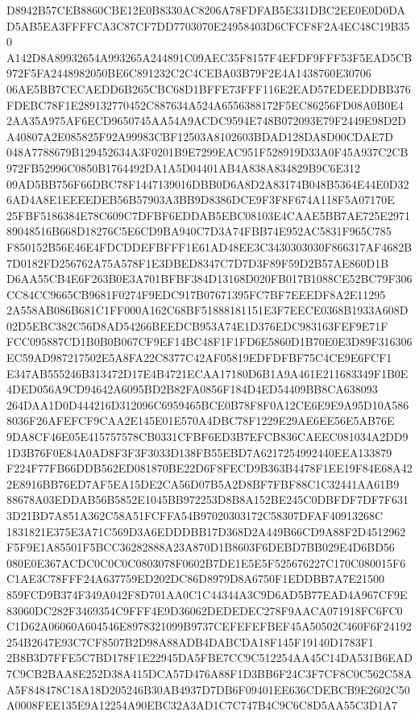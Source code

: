 \documentclass[UTF8,fontset=fandol,zihao=-4,a4paper]{ctexart}
\begin{document}
{{D8942B57CEB8860CBE12E0B8330AC8206A78FDFAB5E331DBC2EE0E0D0DAD5AB5EA3FFFFCA3C87CF7DD7703070E24958403D6CFCF8F2A4EC48C19B350
A142D8A89932654A993265A244891C09AEC35F8157F4EFDF9FFF53F5EAD5CB972F5FA2448982050BE6C891232C2C4CEBA03B79F2E4A1438760E30706
06AE5BB7CECAEDD6B265CBC68D1BFFE73FFF116E2EAD57EDEEDDBB376FDEBC78F1E289132770452C887634A524A6556388172F5EC86256FD08A0B0E4
2AA35A975AF6ECD9650745AA54A9ACDC9594E748B072093E79F2449E98D2DA40807A2E085825F92A99983CBF12503A8102603BDAD128DA8D00CDAE7D
048A7788679B129452634A3F0201B9E7299EAC951F528919D33A0F45A937C2CB972FB52996C0850B1764492DA1A5D04401AB4A838A834829B9C6E312
09AD5BB756F66DBC78F1447139016DBB0D6A8D2A83174B048B5364E44E0D326AD4A8E1EEEEDEB56B57903A3BB9D8386DCE9F3F8F674A118F5A07170E
25FBF5186384E78C609C7DFBF6EDDAB5EBC08103E4CAAE5BB7AE725E297189048516B668D18276C5E6CD9BA940C7D3A74FBB74E952AC5831F965C785
F850152B56E46E4FDCDDEFBFFF1E61AD48EE3C3430303030F866317AF4682B7D0182FD256762A75A578F1E3DBED8347C7D7D3F89F59D2B57AE860D1B
D6AA55CB4E6F263B0E3A701BFBF384D13168D020FB017B1088CE52BC79F306CC84CC9665CB9681F0274F9EDC917B07671395FC7BF7EEEDF8A2E11295
2A558AB086B681C1FF000A162C68BF51888181151E3F7EECE0368B1933A608D02D5EBC382C56D8AD54266BEEDCB953A74E1D376EDC983163FEF9E71F
FCC095887CD1B0B0B067CF9EF14BC48F1F1FD6E5860D1B70E0E3D89F316306EC59AD987217502E5A8FA22C8377C42AF05819EDFDFBF75C4CE9E6FCF1
E347AB555246B313472D17E4B4721ECAA17180D6B1A9A461E211683349F1B0E4DED056A9CD94642A6095BD2B82FA0856F184D4ED54409BB8CA638093
264DAA1D0D444216D312096C6959465BCE0B78F8F0A12CE6E9E9A95D10A5868036F26AFEFCF9CAA2E145E01E570A4DBC78F1229E29AE6EE56E5AB76E
9DA8CF46E05E415757578CB0331CFBF6ED3B7EFCB836CAEEC081034A2DD91D3B76F0E84A0AD8F3F3F3033D138FB55EBD7A6217254992440EEA133879
F224F77FB66DDB562ED081870BE22D6F8FECD9B363B4478F1EE19F84E68A422E8916BB76ED7AF5EA15DE2CA56D07B5A2D8BF7FBF88C1C32441AA61B9
88678A03EDDAB56B5852E1045BB972253D8B8A152BE245C0DBFDF7DF7F6313D21BD7A851A362C58A51FCFFA54B97020303172C58307DFAF40913268C
1831821E375E3A71C569D3A6EDDDBB17D368D2A449B66CD9A88F2D4512962F5F9E1A85501F5BCC36282888A23A870D1B8603F6DEBD7BB029E4D6BD56
080E0E367ACDC0C0C0C0803078F0602B7DE1E5E5F525676227C170C080015F6C1AE3C78FFF24A637759ED202DC86D8979D8A6750F1EDDBB7A7E21500
859FCD9B374F349A042F8D701AA0C1C44344A3C9D6AD5B77EAD4A967CF9E83060DC282F3469354C9FFF4E9D36062DEDEDEC278F9AACA071918FC6FC0
C1D62A06060A604546E8978321099B9737CEFEFEFBEF45A50502C460F6F24192254B2647E93C7CF8507B2D98A88ADB4DABCDA18F145F19140D1783F1
2B8B3D7FFE5C7BD178F1E22945DA5FBE7CC9C512254AA45C14DA531B6EAD7C9CB2BAA8E252D38A415DCA57D476A88F1D3BB6F24C3F7CF8C0C562C58A
A5F848478C18A18D205246B30AB4937D7DB6F09401EE636CDEBCB9E2602C50A0008FEE135E9A12254A90EBC32A3AD1C7C747B4C9C6C8D5AA55C3D1A7
}}
\end{document}
